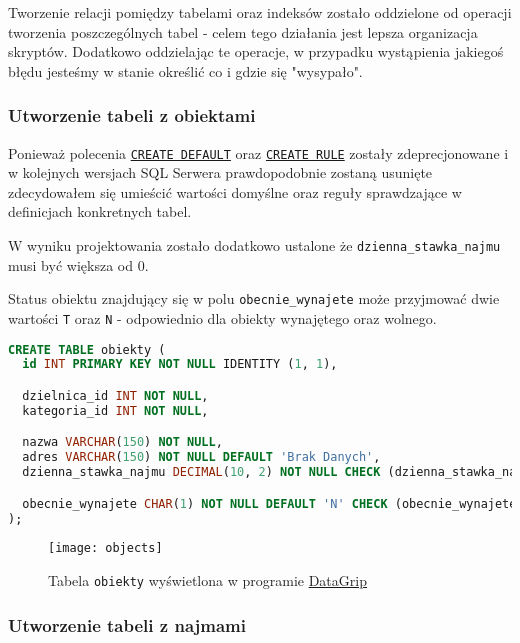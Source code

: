 Tworzenie relacji pomiędzy tabelami oraz indeksów zostało oddzielone od operacji tworzenia poszczególnych tabel - celem tego działania jest lepsza organizacja skryptów. Dodatkowo oddzielając te operacje, w przypadku wystąpienia jakiegoś błędu jesteśmy w stanie określić co i gdzie się "wysypało".

\subsubsection{Utworzenie tabeli z obiektami}

Ponieważ polecenia \href{https://docs.microsoft.com/pl-pl/sql/t-sql/statements/create-default-transact-sql?view=sql-server-2017}{\texttt{CREATE DEFAULT}} oraz \href{https://docs.microsoft.com/pl-pl/sql/t-sql/statements/create-rule-transact-sql?view=sql-server-2017}{\texttt{CREATE RULE}} zostały zdeprecjonowane i w kolejnych wersjach SQL Serwera prawdopodobnie zostaną usunięte zdecydowałem się umieścić wartości domyślne oraz reguły sprawdzające w definicjach konkretnych tabel.

W wyniku projektowania zostało dodatkowo ustalone że \texttt{dzienna\_stawka\_najmu} musi być większa od 0.

Status obiektu znajdujący się w polu \texttt{obecnie\_wynajete} może przyjmować dwie wartości \texttt{T} oraz \texttt{N} - odpowiednio dla obiekty wynajętego oraz wolnego.

\begin{lstlisting}[language=SQL, caption={Skrypt tworzący tabelę \texttt{obiekty}}, label={lst:table-objects}]
CREATE TABLE obiekty (
  id INT PRIMARY KEY NOT NULL IDENTITY (1, 1),

  dzielnica_id INT NOT NULL,
  kategoria_id INT NOT NULL,

  nazwa VARCHAR(150) NOT NULL,
  adres VARCHAR(150) NOT NULL DEFAULT 'Brak Danych',
  dzienna_stawka_najmu DECIMAL(10, 2) NOT NULL CHECK (dzienna_stawka_najmu > 0),

  obecnie_wynajete CHAR(1) NOT NULL DEFAULT 'N' CHECK (obecnie_wynajete IN ('T', 'N')),
);
\end{lstlisting}

\begin{figure}[h]
	\centering
    \texttt{[image: objects]}
	\caption{Tabela \texttt{obiekty} wyświetlona w programie \href{https://www.jetbrains.com/datagrip/}{DataGrip}}
	\label{fig:objects}
\end{figure}

\subsubsection{Utworzenie tabeli z najmami}

